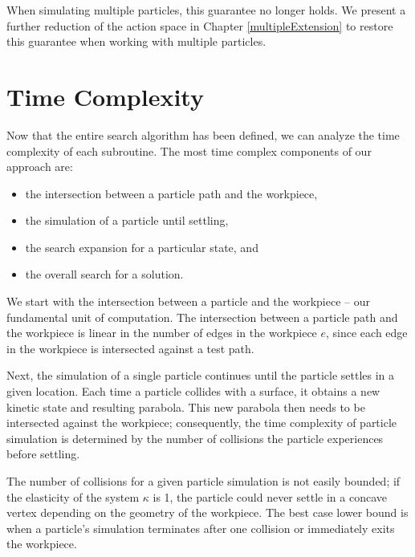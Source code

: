 When simulating multiple particles, this guarantee no longer holds. We present a further reduction of the action space in Chapter \ref{multipleExtension} to restore this guarantee when working with multiple particles.


  \section{Time Complexity}\label{timeComplexity}

Now that the entire search algorithm has been defined, we can analyze the time complexity of each subroutine. The most time complex components of our approach are:

\begin{itemize}
\item the intersection between a particle path and the workpiece,
\item the simulation of a particle until settling,
\item the search expansion for a particular state, and
\item the overall search for a solution.
\end{itemize}

We start with the intersection between a particle and the workpiece -- our fundamental unit of computation. The intersection between a particle path and the workpiece is linear in the number of edges in the workpiece $e$, since each edge in the workpiece is intersected against a test path.

Next, the simulation of a single particle continues until the particle settles in a given location. Each time a particle collides with a surface, it obtains a new kinetic state and resulting parabola. This new parabola then needs to be intersected against the workpiece; consequently, the time complexity of particle simulation is determined by the number of collisions the particle experiences before settling.

The number of collisions for a given particle simulation is not easily bounded; if the elasticity of the system $\kappa$ is 1, the particle could never settle in a concave vertex depending on the geometry of the workpiece. The best case lower bound is when a particle's simulation terminates after one collision or immediately exits the workpiece.

